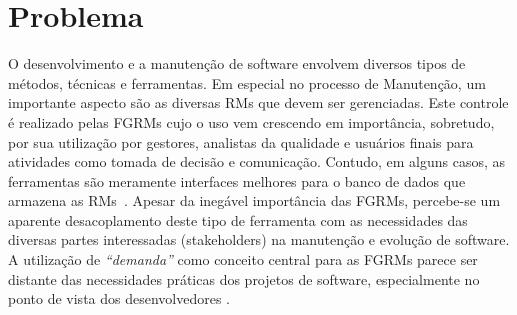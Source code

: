 %

%

\section{Problema}
\label{sec:intro-problema}

O desenvolvimento e a manutenção de software envolvem diversos tipos de métodos,
técnicas e ferramentas. Em especial no processo de Manutenção, um importante
aspecto são as diversas RMs que devem ser gerenciadas. Este controle é realizado
pelas FGRMs cujo o uso vem crescendo em importância, sobretudo, por sua
utilização por gestores, analistas da qualidade e usuários finais para
atividades como tomada de decisão e comunicação. Contudo, em alguns casos, as
ferramentas são meramente interfaces melhores para o banco de dados que
armazena as RMs~\cite{zimmermann2009improving}. Apesar da inegável importância
das FGRMs, percebe-se um aparente desacoplamento deste tipo de ferramenta com as
necessidades das diversas partes interessadas (stakeholders) na manutenção e
evolução de software. A utilização de \textit{``demanda''} como conceito central
para as FGRMs parece ser distante das necessidades práticas dos projetos de
software, especialmente no ponto de vista dos desenvolvedores
\cite{Baysal:2013:SAP:2486788.2486957}.


